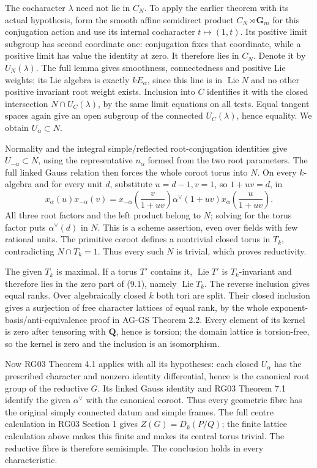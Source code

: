 \documentclass[11pt,a4paper,openany]{report}
\begin{document}
The cocharacter \(\lambda\) need not lie in \(C_N\). To apply the earlier theorem with its actual hypothesis, form the smooth affine semidirect product \(C_N\rtimes\mathbf G_m\) for this conjugation action and use its internal cocharacter \(t\mapsto(1,t)\). Its positive limit subgroup has second coordinate one: conjugation fixes that coordinate, while a positive limit has value the identity at zero. It therefore lies in \(C_N\). Denote it by \(U_N(\lambda)\). The full lemma gives smoothness, connectedness and positive Lie weights; its Lie algebra is exactly \(kE_\alpha\), since this line is in \(\operatorname{Lie}N\) and no other positive invariant root weight exists. Inclusion into \(C\) identifies it with the closed intersection \(N\cap U_C(\lambda)\), by the same limit equations on all tests. Equal tangent spaces again give an open subgroup of the connected \(U_C(\lambda)\), hence equality. We obtain \(U_\alpha\subset N\).

Normality and the integral simple/reflected root-conjugation identities give \(U_{-\alpha}\subset N\), using the representative \(n_\alpha\) formed from the two root parameters. The full linked Gauss relation then forces the whole coroot torus into \(N\). On every \(k\)-algebra and for every unit \(d\), substitute \(u=d-1,v=1\), so \(1+uv=d\), in \[
x_\alpha(u)x_{-\alpha}(v)
=x_{-\alpha}\!\left(\frac v{1+uv}\right)
 \alpha^\vee(1+uv)
 x_\alpha\!\left(\frac u{1+uv}\right).
\] All three root factors and the left product belong to \(N\); solving for the torus factor puts \(\alpha^\vee(d)\) in \(N\). This is a scheme assertion, even over fields with few rational units. The primitive coroot defines a nontrivial closed torus in \(T_k\), contradicting \(N\cap T_k=1\). Thus every such \(N\) is trivial, which proves reductivity.

The given \(T_k\) is maximal. If a torus \(T'\) contains it, \(\operatorname{Lie}T'\) is \(T_k\)-invariant and therefore lies in the zero part of (9.1), namely \(\operatorname{Lie}T_k\). The reverse inclusion gives equal ranks. Over algebraically closed \(k\) both tori are split. Their closed inclusion gives a surjection of free character lattices of equal rank, by the whole exponent-basis/anti-equivalence proof in AG-GS Theorem 2.2. Every element of its kernel is zero after tensoring with \(\mathbf Q\), hence is torsion; the domain lattice is torsion-free, so the kernel is zero and the inclusion is an isomorphism.

Now RG03 Theorem 4.1 applies with all its hypotheses: each closed \(U_\alpha\) has the prescribed character and nonzero identity differential, hence is the canonical root group of the reductive \(G\). Its linked Gauss identity and RG03 Theorem 7.1 identify the given \(\alpha^\vee\) with the canonical coroot. Thus every geometric fibre has the original simply connected datum and simple frames. The full centre calculation in RG03 Section 1 gives \(Z(G)=D_k(P/Q)\); the finite lattice calculation above makes this finite and makes its central torus trivial. The reductive fibre is therefore semisimple. The conclusion holds in every characteristic.
\end{document}
